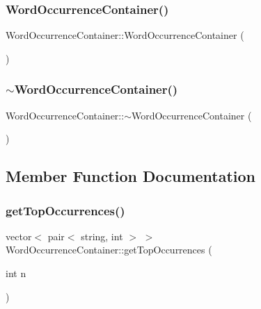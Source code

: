 \subsubsection{\texorpdfstring{Word\+Occurrence\+Container()}{WordOccurrenceContainer()}}
{\footnotesize\ttfamily Word\+Occurrence\+Container\+::\+Word\+Occurrence\+Container (\begin{DoxyParamCaption}{ }\end{DoxyParamCaption})}

\mbox{\label{class_word_occurrence_container_a96a671f07750218a9325a8cab89288ef}} 
\subsubsection{\texorpdfstring{$\sim$\+Word\+Occurrence\+Container()}{~WordOccurrenceContainer()}}
{\footnotesize\ttfamily Word\+Occurrence\+Container\+::$\sim$\+Word\+Occurrence\+Container (\begin{DoxyParamCaption}{ }\end{DoxyParamCaption})}



\subsection{Member Function Documentation}
\mbox{\label{class_word_occurrence_container_a383cebef200a3e2c12dcf4015381023f}} 
\subsubsection{\texorpdfstring{get\+Top\+Occurrences()}{getTopOccurrences()}}
{\footnotesize\ttfamily vector$<$ pair$<$ string, int $>$ $>$ Word\+Occurrence\+Container\+::get\+Top\+Occurrences (\begin{DoxyParamCaption}\item[{int}]{n }\end{DoxyParamCaption})}



